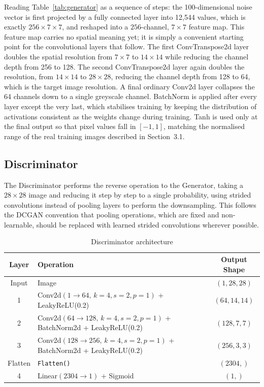 \documentclass[12pt,a4paper]{article}
\begin{document}
Reading Table~\ref{tab:generator} as a sequence of steps: the 100-dimensional noise
vector is first projected by a fully connected layer into 12,544 values, which is exactly
$256 \times 7 \times 7$, and reshaped into a $256$-channel, $7 \times 7$ feature map. This
feature map carries no spatial meaning yet; it is simply a convenient starting point for
the convolutional layers that follow. The first ConvTranspose2d layer doubles the spatial
resolution from $7 \times 7$ to $14 \times 14$ while reducing the channel depth from 256
to 128. The second ConvTranspose2d layer again doubles the resolution, from $14 \times 14$
to $28 \times 28$, reducing the channel depth from 128 to 64, which is the target image
resolution. A final ordinary Conv2d layer collapses the 64 channels down to a single
greyscale channel. BatchNorm is applied after every layer except the very last, which
stabilises training by keeping the distribution of activations consistent as the weights
change during training. Tanh is used only at the final output so that pixel values fall
in $[-1, 1]$, matching the normalised range of the real training images described in
Section~3.1.

\subsection{Discriminator}

The Discriminator performs the reverse operation to the Generator, taking a $28 \times 28$
image and reducing it step by step to a single probability, using strided convolutions
instead of pooling layers to perform the downsampling. This follows the DCGAN convention
that pooling operations, which are fixed and non-learnable, should be replaced with
learned strided convolutions wherever possible.

\begin{table}[H]
    \begin{center}
        \small
        \begin{tabular}{|c|L{8.6cm}|c|}
            \hline
            \textbf{Layer} & \textbf{Operation} & \textbf{Output Shape} \\
            \hline
            Input & Image & $(1, 28, 28)$ \\
             & Conv2d$(1 \to 64,\, k{=}4, s{=}2, p{=}1)$ + LeakyReLU(0.2) & $(64, 14, 14)$ \\
             & Conv2d$(64 \to 128,\, k{=}4, s{=}2, p{=}1)$ + BatchNorm2d + LeakyReLU(0.2) & $(128, 7, 7)$ \\
             & Conv2d$(128 \to 256,\, k{=}4, s{=}2, p{=}1)$ + BatchNorm2d + LeakyReLU(0.2) & $(256, 3, 3)$ \\
            \hline
            Flatten & \texttt{Flatten()} & $(2304,)$ \\
             & Linear$(2304 \to 1)$ + Sigmoid & $(1,)$ \\
            \hline
        \end{tabular}
        \caption{Discriminator architecture}
        \label{tab:discriminator}
    \end{center}
\end{table}
\end{document}
